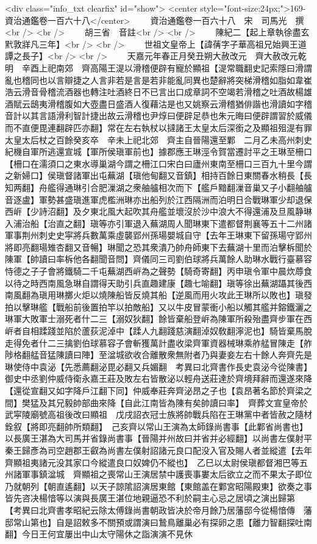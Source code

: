 <div class="info_txt clearfix" id="show">
<center style="font-size:24px;">169-資治通鑑卷一百六十八</center>
  　　資治通鑑卷一百六十八　宋　司馬光　撰<br />
<br />
　　胡三省　音註<br />
<br />
　　陳紀二【起上章執徐盡玄黓敦牂凡三年】<br />
<br />
　　世祖文皇帝上【諱蒨字子華高祖兄始興王道譚之長子】<br />
<br />
　　天嘉元年春正月癸丑朔大赦改元　齊大赦改元乾明　辛酉上祀南郊　齊高陽王湜以滑稽便辟有寵於顯祖【湜常職翻史記索隱曰滑謂亂也稽同也以言辯捷之人言非若是言是若非能亂同異也楚辭將突梯滑稽如脂如韋崔浩云滑音骨稽流酒器也轉注吐酒終日不已言出口成章詞不空竭若滑稽之吐酒故楊雄酒賦云鴟夷滑稽腹如大壺盡日盛酒人復藉沽是也又姚察云滑稽猶俳諧也滑讀如字稽音計以其言語滑利智計捷出故云滑稽也尹焞曰便辟足恭也朱元晦曰便辟謂習於威儀而不直便毘連翻辟匹亦翻】常在左右執杖以撻諸王太皇太后深銜之及顯祖殂湜有罪太皇太后杖之百餘癸亥卒　辛未上祀北郊　齊主自晉陽還至鄴　二月乙未高州刺史紀機自軍所逃還宣城【軍所侯瑱軍前也】據郡應王琳涇令賀當遷討平之王琳至柵口【柵口在濡須口之東水導巢湖今謂之柵江口宋白曰廬州東南至柵口三百九十里今謂之新婦口】侯瑱督諸軍出屯蕪湖【瑱他甸翻又音鎮】相持百餘日東關春水稍長【長知两翻】舟艦得通琳引合肥漅湖之衆舳艫相次而下【艦戶黯翻漅音巢又子小翻舳艫音逐盧】軍勢甚盛瑱進軍虎檻洲琳亦出船列於江西隔洲而泊明日合戰琳軍少却退保西㟁【少詩沼翻】及夕東北風大起吹其舟艦並壞沒於沙中浪大不得還浦及旦風静琳入浦治船【治直之翻】瑱等亦引軍退入蕪湖周人聞琳東下遣都督荆襄等五十二州諸軍事荆州刺史史寜將兵數萬乘虛襲郢州孫瑒嬰城自守【去年王琳東下留孫瑒守郢州將即亮翻瑒雉杏翻又音暢】琳聞之恐其衆潰乃帥舟師東下去蕪湖十里而泊擊柝聞於陳軍【帥讀曰率柝他各翻聞音問】齊儀同三司劉伯球將兵萬餘人助琳水戰行臺慕容恃德之子子會將鐵騎二千屯蕪湖西㟁為之聲勢【騎奇寄翻】丙申瑱令軍中晨炊蓐食以待之時西南風急琳自謂得天助引兵直趣建康【趣七喻翻】瑱等徐出蕪湖躡其後西南風翻為瑱用琳擲火炬以燒陳船皆反燒其船【逆風而用火攻此王琳所以敗也】瑱發拍以擊琳艦【戰船前後置拍竿以拍敵船】又以牛皮冒蒙衝小船以觸其艦并鎔鐵灑之琳軍大敗軍士溺死者什二三【溺奴狄翻】餘皆棄船登㟁為陳軍所殺殆盡齊步軍在西㟁者自相蹂踐並陷於蘆荻泥淖中【蹂人九翻踐慈演翻淖奴敎翻濘泥也】騎皆棄馬脫走得免者什二三擒劉伯球慕容子會斬獲萬計盡收梁齊軍資器械琳乘舴艋冒陳走【舴陟格翻艋音猛陳讀曰陣】至湓城欲收合離散衆無附者乃與妻妾左右十餘人奔齊先是琳使侍中袁泌【先悉薦翻泌毘必翻又兵媚翻　考異曰北齊書作長史袁泌今從陳書】御史中丞劉仲威侍衛永嘉王莊及敗左右皆散泌以輕舟送莊達於齊境拜辭而還遂來降【還從宣翻又如字降戶江翻下同】仲威奉莊奔齊泌昂之子也【袁昂著名節於齊梁之間】樊猛及其兄毅帥部曲來降【自此江南皆為陳有矣帥讀曰率】　齊葬文宣皇帝於武寜陵廟號高祖後改曰顯祖　戊戌詔衣冠士族將帥戰兵陷在王琳黨中者皆赦之隨材銓叙【將即亮翻帥所類翻】　己亥齊以常山王演為太師錄尚書事【此鄴省尚書也】以長廣王湛為大司馬并省錄尚書事【晉陽并州故曰并省并必經翻】以尚書左僕射平秦王歸彥為司空趙郡王叡為尚書左僕射詔諸元良口配没入官及賜人者並縱遣【去年齊顯祖夷諸元没其家口今縱遣良口奴婢仍不縱也】　乙巳以太尉侯瑱都督湘巴等五州諸軍事鎮湓城　齊顯祖之喪常山王演居禁中護喪事婁太后欲立之而不果太子即位乃就朝列【朝直遙翻】以天子諒隂詔演居東館【東館盖在鄴宮昭陽殿東】欲奏之事皆先咨决楊愔等以演與長廣王湛位地親逼恐不利於嗣主心忌之居頃之演出歸第　【考異曰北齊書孝昭紀云除太傅錄尚書朝政皆决於帝月餘乃居藩邸今從楊愔傳　藩邸常山第也】自是詔敕多不關預或謂演曰鷙鳥離巢必有探卵之患【離力智翻探吐南翻】今日王何宜屢出中山太守陽休之詣演演不見休